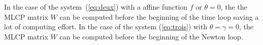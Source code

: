 In the case of the system~(\ref{eq:deux}) with a affine function $f$ or $\theta =0$, the the MLCP matrix $W$ can be computed before the beginning of the time loop saving a lot of computing effort.  In the case of the system (\ref{eq:trois}) with $\theta=\gamma=0$, the MLCP matrix $W$ can be computed before the beginning of the Newton loop.
\clearpage



